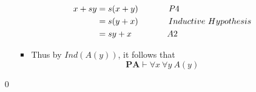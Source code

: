 \documentclass[11pt,twoside]{article}
\begin{document}
\begin{enumerate}[leftmargin=0pt]
\begin{itemize}[label ={}]
\begin{itemize}[label ={}]
					\begin{align} \nonumber
                                        			x+ sy &= s(x+y)  \hskip3pc  P4\\ \nonumber
								&= s(y+x)\hskip3pc   Inductive \ Hypothesis \\ \nonumber
                                        				& = sy+x 	\hskip3.5pc  A2 \nonumber
                        			\end{align}
			\item Thus by $Ind(A(y))$, it follows that 
					\[ \textbf{PA}  \vdash \forall x \ \forall y \  A(y) \]
			\end{itemize}
	\end{itemize}
	\qed
\end{enumerate}
\end{document}
